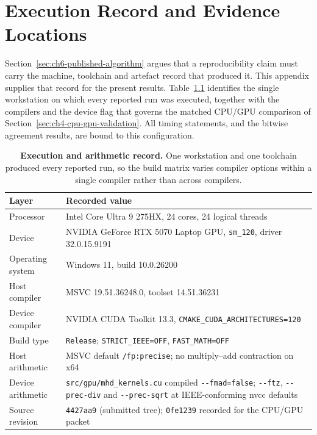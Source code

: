 \chapter{Execution Record and Evidence Locations}
\label{sec:appendix-provenance}

Section~\ref{sec:ch6-published-algorithm} argues that a reproducibility claim
must carry the machine, toolchain and artefact record that produced it. This
appendix supplies that record for the present results.
Table~\ref{tab:appendix-platform} identifies the single workstation on which
every reported run was executed, together with the compilers and the device
flag that governs the matched CPU/GPU comparison of
Section~\ref{sec:ch4-cpu-gpu-validation}. All timing statements, and the
bitwise agreement results, are bound to this configuration.

\begin{table}[htbp]
\centering
\small
\begin{tabularx}{\textwidth}{@{}lX@{}}
\toprule
Layer & Recorded value \\
\midrule
Processor & Intel Core Ultra 9 275HX, 24 cores, 24 logical threads \\
Device & NVIDIA GeForce RTX 5070 Laptop GPU, \texttt{sm\_120}, driver 32.0.15.9191 \\
Operating system & Windows 11, build 10.0.26200 \\
Host compiler & MSVC 19.51.36248.0, toolset 14.51.36231 \\
Device compiler & NVIDIA CUDA Toolkit 13.3, \texttt{CMAKE\_CUDA\_ARCHITECTURES=120} \\
Build type & \texttt{Release}; \texttt{STRICT\_IEEE=OFF}, \texttt{FAST\_MATH=OFF} \\
Host arithmetic & MSVC default \texttt{/fp:precise}; no multiply--add contraction on x64 \\
Device arithmetic & \texttt{src/gpu/mhd\_kernels.cu} compiled \texttt{-{}-fmad=false};
  \texttt{-{}-ftz}, \texttt{-{}-prec-div} and \texttt{-{}-prec-sqrt} at IEEE-conforming
  nvcc defaults \\
Source revision & \texttt{4427aa9} (submitted tree); \texttt{0fe1239} recorded for the
  CPU/GPU packet \\
\bottomrule
\end{tabularx}
\caption[Execution and arithmetic record]{\textbf{Execution and arithmetic
record.} One workstation and one toolchain produced every reported run, so the
build matrix varies compiler options within a single compiler rather than
across compilers.}
\label{tab:appendix-platform}
\end{table}

